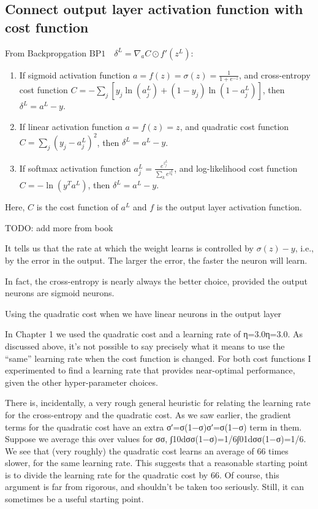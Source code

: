 \documentclass[]{book}
\begin{document}
\subsection{Connect output layer activation function with cost
function}\label{connect-output-layer-activation-function-with-cost-function}

From Backpropgation
\(\mbox{BP1}\quad\delta^L = \nabla_a C \odot f'(z^L)\):

\begin{enumerate}
\def\labelenumi{\arabic{enumi}.}
\item
  If sigmoid activation function
  \(a = f(z) = \sigma(z) = \displaystyle \frac{1}{1+e^{-z}}\), and
  cross-entropy cost function
  \(C = -\sum_{j}\left[y_j\ln(a_j^L)+(1-y_j)\ln(1-a_j^L)\right]\), then
  \(\delta^L = a^L-y\).
\item
  If linear activation function \(a = f(z) = z\), and quadratic cost
  function \(C = \sum_j\left(y_j - a_j^L\right)^2\), then
  \(\delta^L = a^L-y\).
\item
  If softmax activation function
  \(a_j^L = \frac{e^{z_j^L}}{\sum_k e^{z_k^L}}\), and log-likelihood
  cost function \(C = -\ln(y^Ta^L)\), then \(\delta^L = a^L-y\).
\end{enumerate}

Here, \(C\) is the cost function of \(a^L\) and \(f\) is the output
layer activation function.

TODO: add more from book

It tells us that the rate at which the weight learns is controlled by
\(\sigma(z) - y\), i.e., by the error in the output. The larger the
error, the faster the neuron will learn.

In fact, the cross-entropy is nearly always the better choice, provided
the output neurons are sigmoid neurons.

Using the quadratic cost when we have linear neurons in the output layer

In Chapter 1 we used the quadratic cost and a learning rate of
η=3.0η=3.0. As discussed above, it's not possible to say precisely what
it means to use the ``same'' learning rate when the cost function is
changed. For both cost functions I experimented to find a learning rate
that provides near-optimal performance, given the other hyper-parameter
choices.

There is, incidentally, a very rough general heuristic for relating the
learning rate for the cross-entropy and the quadratic cost. As we saw
earlier, the gradient terms for the quadratic cost have an extra
σ′=σ(1−σ)σ′=σ(1−σ) term in them. Suppose we average this over values for
σσ, ∫10dσσ(1−σ)=1/6∫01dσσ(1−σ)=1/6. We see that (very roughly) the
quadratic cost learns an average of 66 times slower, for the same
learning rate. This suggests that a reasonable starting point is to
divide the learning rate for the quadratic cost by 66. Of course, this
argument is far from rigorous, and shouldn't be taken too seriously.
Still, it can sometimes be a useful starting point.
\end{document}
